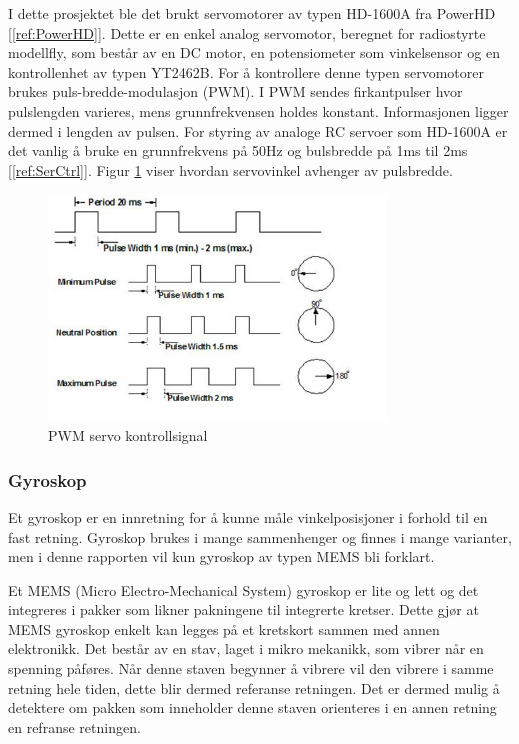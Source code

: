I dette prosjektet ble det brukt servomotorer av typen HD-1600A fra PowerHD [\ref{ref:PowerHD}]. Dette er en enkel analog servomotor, beregnet for radiostyrte modellfly, som består av en DC motor, en potensiometer som vinkelsensor og en kontrollenhet av typen YT2462B. For å kontrollere denne typen servomotorer brukes puls-bredde-modulasjon (PWM). I PWM sendes firkantpulser hvor pulslengden varieres, mens grunnfrekvensen holdes konstant. Informasjonen ligger dermed i lengden av pulsen. For styring av analoge RC servoer som HD-1600A er det vanlig å bruke en grunnfrekvens på 50Hz og bulsbredde på 1ms til 2ms [\ref{ref:SerCtrl}]. Figur \ref{fig:PWM} viser hvordan servovinkel avhenger av pulsbredde.

\begin{figure}[H]
\centering
\includegraphics[width=0.8\textwidth]{img/pwm_servo.jpg}
\caption{PWM servo kontrollsignal}
\label{fig:PWM}
\end{figure}   


\subsubsection{Gyroskop}
Et gyroskop er en innretning for å kunne måle vinkelposisjoner i forhold til en fast retning. Gyroskop brukes i mange sammenhenger og finnes i mange varianter, men i denne rapporten vil kun gyroskop av typen MEMS bli forklart. 

Et MEMS (Micro Electro-Mechanical System) gyroskop er lite og lett og det integreres i pakker som likner pakningene til integrerte kretser. Dette gjør at MEMS gyroskop enkelt kan legges på et kretskort sammen med annen elektronikk. Det består av en stav, laget i mikro mekanikk, som vibrer når en spenning påføres. Når denne staven begynner å vibrere vil den vibrere i samme retning hele tiden, dette blir dermed referanse retningen.  Det er dermed mulig å detektere om pakken som inneholder denne staven orienteres i en annen retning en refranse retningen. 
